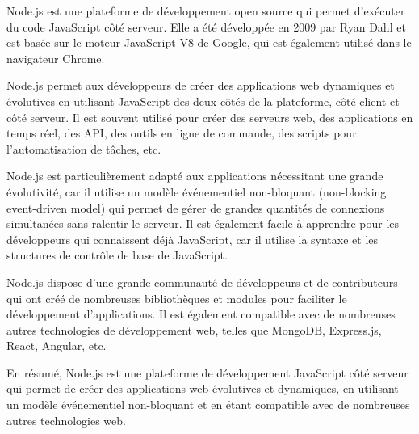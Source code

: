Node.js est une plateforme de développement open source qui permet d'exécuter du code JavaScript côté serveur. Elle a été développée en 2009 par Ryan Dahl et est basée sur le moteur JavaScript V8 de Google, qui est également utilisé dans le navigateur Chrome.

Node.js permet aux développeurs de créer des applications web dynamiques et évolutives en utilisant JavaScript des deux côtés de la plateforme, côté client et côté serveur. Il est souvent utilisé pour créer des serveurs web, des applications en temps réel, des API, des outils en ligne de commande, des scripts pour l'automatisation de tâches, etc.

Node.js est particulièrement adapté aux applications nécessitant une grande évolutivité, car il utilise un modèle événementiel non-bloquant (non-blocking event-driven model) qui permet de gérer de grandes quantités de connexions simultanées sans ralentir le serveur. Il est également facile à apprendre pour les développeurs qui connaissent déjà JavaScript, car il utilise la syntaxe et les structures de contrôle de base de JavaScript.

Node.js dispose d'une grande communauté de développeurs et de contributeurs qui ont créé de nombreuses bibliothèques et modules pour faciliter le développement d'applications. Il est également compatible avec de nombreuses autres technologies de développement web, telles que MongoDB, Express.js, React, Angular, etc.

En résumé, Node.js est une plateforme de développement JavaScript côté serveur qui permet de créer des applications web évolutives et dynamiques, en utilisant un modèle événementiel non-bloquant et en étant compatible avec de nombreuses autres technologies web.